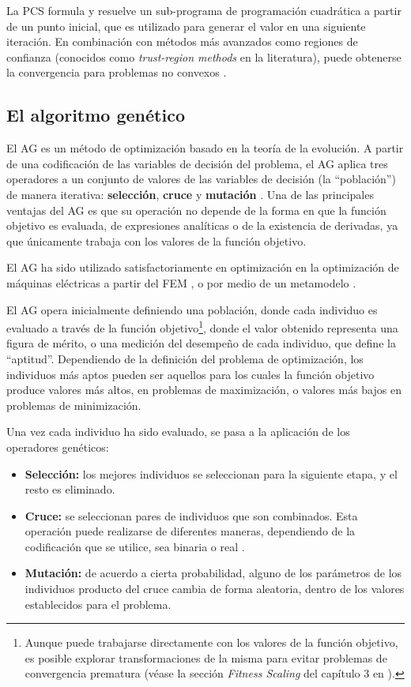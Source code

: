 La PCS formula y resuelve un sub-programa de programación cuadrática a partir de un punto inicial, que es utilizado para generar el valor en una siguiente iteración. En combinación con métodos más avanzados como regiones de confianza (conocidos como \textit{trust-region methods} en la literatura), puede obtenerse la convergencia para problemas no convexos \cite{nocedal1999}.

\subsection{El algoritmo genético}
El AG es un método de optimización basado en la teoría de la evolución. A partir de una codificación de las variables de decisión del problema, el AG aplica tres operadores a un conjunto de valores de las variables de decisión (la ``población'') de manera iterativa: \textbf{selección}, \textbf{cruce} y \textbf{mutación} \cite{goldberg1989}. Una de las principales ventajas del AG es que su operación no depende de la forma en que la función objetivo es evaluada, de expresiones analíticas o de la existencia de derivadas, ya que únicamente trabaja con los valores de la función objetivo.

El AG ha sido utilizado satisfactoriamente en optimización en la optimización de máquinas eléctricas a partir del FEM \cite{cassimere2009,dinardo2015,tuvsar2007}, o por medio de un metamodelo \cite{hasanien2010b}.

El AG opera inicialmente definiendo una población, donde cada individuo es evaluado a través de la función objetivo\footnote{Aunque puede trabajarse directamente con los valores de la función objetivo, es posible explorar transformaciones de la misma para evitar problemas de convergencia prematura (véase la sección \textit{Fitness Scaling} del capítulo 3 en \cite{goldberg1989}).}, donde el valor obtenido representa una figura de mérito, o una medición del desempeño de cada individuo, que define la ``aptitud''. Dependiendo de la definición del problema de optimización, los individuos más aptos pueden ser aquellos para los cuales la función objetivo produce valores más altos, en problemas de maximización, o valores más bajos en problemas de minimización.

Una vez cada individuo ha sido evaluado, se pasa a la aplicación de los operadores genéticos:
\begin{itemize}
\item \textbf{Selección:} los mejores individuos se seleccionan para la siguiente etapa, y el resto es eliminado.
\item \textbf{Cruce:} se seleccionan pares de individuos que son combinados. Esta operación puede realizarse de diferentes maneras, dependiendo de la codificación que se utilice, sea binaria o real \cite{herrera1998}.
\item \textbf{Mutación:} de acuerdo a cierta probabilidad, alguno de los parámetros de los individuos producto del cruce cambia de forma aleatoria, dentro de los valores establecidos para el problema.
\end{itemize}

